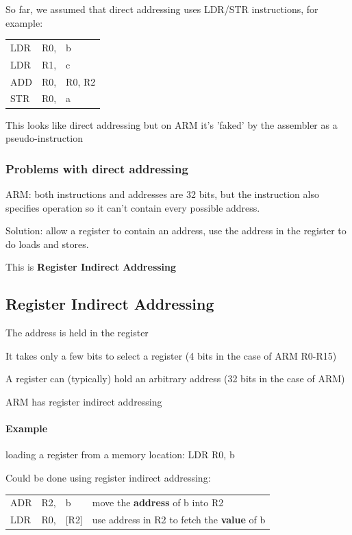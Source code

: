 \documentclass{article}
\begin{document}
So far, we assumed that direct addressing uses LDR/STR instructions, for example:

\begin{center}
    \begin{tabular}{l l l}
        LDR & R0, & b\\
        LDR & R1, & c\\
        ADD & R0, & R0, R2\\
        STR & R0, & a \\
    \end{tabular}
\end{center}

This looks like direct addressing but on ARM it's 'faked' by the assembler as a pseudo-instruction

\subsubsection{Problems with direct addressing}
ARM: both instructions and addresses are 32 bits, but the instruction also specifies operation so it can't contain every possible address.

Solution: allow a register to contain an address, use the address in the register to do loads and stores.

This is {\bf Register Indirect Addressing}

\subsection{Register Indirect Addressing}
The address is held in the register

It takes only a few bits to select a register (4 bits in the case of ARM R0-R15)

A register can (typically) hold an arbitrary address (32 bits in the case of ARM)

ARM has register indirect addressing

\paragraph{Example}
loading a register from a memory location: LDR R0, b

Could be done using register indirect addressing:

\begin{center}
    \begin{tabular}{l l l l}
        ADR & R2, & b & move the {\bf address} of b into R2\\
        LDR & R0, & [R2] & use address in R2 to fetch the {\bf value} of b\\
    \end{tabular}
\end{center}
\end{document}
